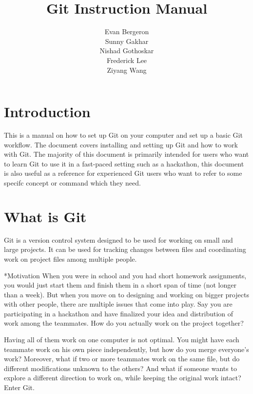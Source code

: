 \documentclass{amsart}
\title{Git Instruction Manual}
\author{Evan Bergeron\\
Sunny Gakhar\\
Nishad Gothoskar\\
Frederick Lee\\
Ziyang Wang
}
\makeatletter
\renewcommand\subsection{\@startsection{subsection}{2}%
  \z@{-.5\linespacing\@plus-.7\linespacing}{.5\linespacing}%
  {\normalfont\scshape}}
\makeatother
\begin{document}
\maketitle

\tableofcontents
\newpage
\section*{Introduction}

This is a manual on how to set up Git on your computer and set up a basic Git workflow. The document covers installing and setting up Git and how to work with Git. The majority of this document is primarily intended for users who want to learn Git to use it in a fast-paced setting such as a hackathon, this document is also useful as a reference for experienced Git users who want to refer to some specifc concept or command which they need.

\section*{What is Git}

Git is a version control system designed to be used for working on small and large projects. It can be used for tracking changes between files and coordinating work on project files among multiple people.

\subsection*{Motivation}
When you were in school and you had short homework assignments, you would just start them and finish them in a short span of time (not longer than a week). But when you move on to designing and working on bigger projects with other people, there are multiple issues that come into play. Say you are participating in a hackathon and have finalized your idea and distribution of work among the teammates. How do you actually work on the project together? 

Having all of them work on one computer is not optimal. You might have each teammate work on his own piece independently, but how do you merge everyone's work? Moreover, what if two or more teammates work on the same file, but do different modifications unknown to the others? And what if someone wants to explore a different direction to work on, while keeping the original work intact? Enter Git.
\end{document}
